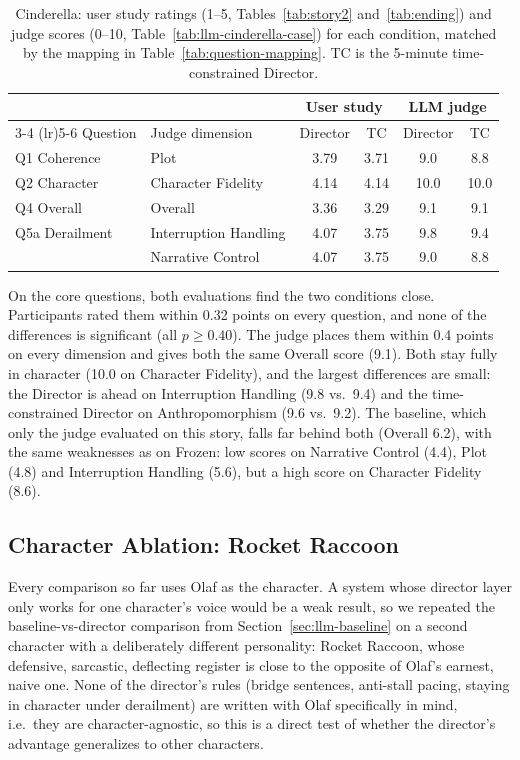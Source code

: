 \begin{table}[htbp]
\centering
\caption{Cinderella: user study ratings (1--5, Tables~\ref{tab:story2} and~\ref{tab:ending}) and judge scores (0--10, Table~\ref{tab:llm-cinderella-case}) for each condition, matched by the mapping in Table~\ref{tab:question-mapping}. TC is the 5-minute time-constrained Director.}
\label{tab:cinderella-side}
\small
\begin{tabular}{llcccc}
\toprule
 & & \multicolumn{2}{c}{User study} & \multicolumn{2}{c}{LLM judge} \\
\cmidrule(lr){3-4} \cmidrule(lr){5-6}
Question & Judge dimension & Director & TC & Director & TC \\
\midrule
Q1 Coherence    & Plot                  & 3.79 & 3.71 & 9.0 & 8.8 \\
Q2 Character    & Character Fidelity    & 4.14 & 4.14 & 10.0 & 10.0 \\
Q4 Overall      & Overall               & 3.36 & 3.29 & 9.1 & 9.1 \\
Q5a Derailment  & Interruption Handling & 4.07 & 3.75 & 9.8 & 9.4 \\
                & Narrative Control     & 4.07 & 3.75 & 9.0 & 8.8 \\
\bottomrule
\end{tabular}
\end{table}

On the core questions, both evaluations find the two conditions close. Participants rated them within 0.32 points on every question, and none of the differences is significant (all $p \ge 0.40$). The judge places them within 0.4 points on every dimension and gives both the same Overall score (9.1). Both stay fully in character (10.0 on Character Fidelity), and the largest differences are small: the Director is ahead on Interruption Handling (9.8 vs.\ 9.4) and the time-constrained Director on Anthropomorphism (9.6 vs.\ 9.2). The baseline, which only the judge evaluated on this story, falls far behind both (Overall 6.2), with the same weaknesses as on Frozen: low scores on Narrative Control (4.4), Plot (4.8) and Interruption Handling (5.6), but a high score on Character Fidelity (8.6).

\subsection{Character Ablation: Rocket Raccoon}
\label{sec:llm-rocket}

Every comparison so far uses Olaf as the character. A system whose director layer only works for one character's voice would be a weak result, so we repeated the baseline-vs-director comparison from Section~\ref{sec:llm-baseline} on a second character with a deliberately different personality: Rocket Raccoon, whose defensive, sarcastic, deflecting register is close to the opposite of Olaf's earnest, naive one. None of the director's rules (bridge sentences, anti-stall pacing, staying in character under derailment) are written with Olaf specifically in mind, i.e.\ they are character-agnostic, so this is a direct test of whether the director's advantage generalizes to other characters.

